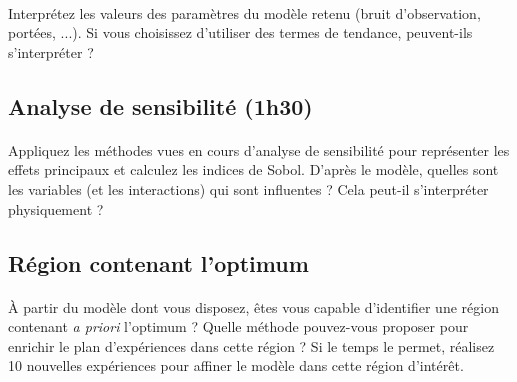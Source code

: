 \documentclass[a4paper,10pt]{article}
\begin{document}
\paragraph{}
Interprétez les valeurs des paramètres du modèle retenu (bruit d'observation, portées, ...). Si vous choisissez d'utiliser des termes de tendance, peuvent-ils s'interpréter ?

\subsection*{Analyse de sensibilité (1h30)}
\paragraph{}
Appliquez les méthodes vues en cours d'analyse de sensibilité pour représenter les effets principaux et calculez les indices de Sobol. D'après le modèle, quelles sont les variables (et les interactions) qui sont influentes ? Cela peut-il s'interpréter physiquement ?

\subsection*{Région contenant l'optimum}
\paragraph{}
À partir du modèle dont vous disposez, êtes vous capable d'identifier une région contenant \emph{a priori} l'optimum ? Quelle méthode pouvez-vous proposer pour enrichir le plan d'expériences dans cette région ? Si le temps le permet, réalisez 10 nouvelles expériences pour affiner le modèle dans cette région d'intérêt.
\end{document}
